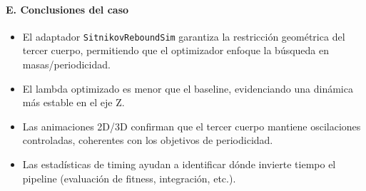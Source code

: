 \paragraph{E. Conclusiones del caso}
\begin{itemize}
    \item El adaptador \texttt{SitnikovReboundSim} garantiza la restricción geométrica del tercer cuerpo, permitiendo que el optimizador enfoque la búsqueda en masas/periodicidad.
    \item El lambda optimizado es menor que el baseline, evidenciando una dinámica más estable en el eje Z.
    \item Las animaciones 2D/3D confirman que el tercer cuerpo mantiene oscilaciones controladas, coherentes con los objetivos de periodicidad.
    \item Las estadísticas de timing ayudan a identificar dónde invierte tiempo el pipeline (evaluación de fitness, integración, etc.).
\end{itemize}
